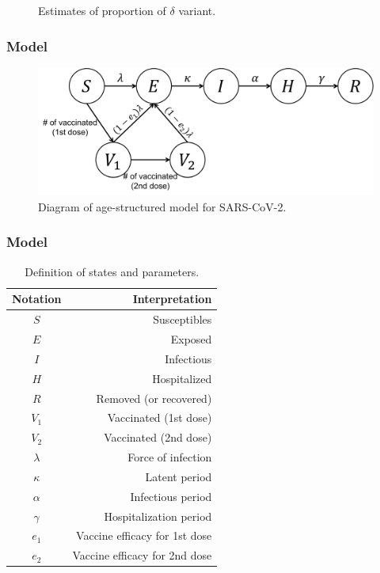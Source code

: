 \documentclass[aspectratio=169, 9pt, xcolor=dvipsnames]{beamer}
\begin{document}
\begin{frame}
\begin{minipage}{0.6\textwidth}
\begin{figure}
	    		\caption{Estimates of proportion of $\delta$ variant.}
	    	\end{figure}
	    \end{minipage}
	\end{frame}

	\begin{frame}\frametitle{Model}
	    \begin{figure}
	    	\centering
	    	\includegraphics[width=12cm]{diagram.pdf}
	    	\caption{Diagram of age-structured model for SARS-CoV-2.}
	    \end{figure}
	\end{frame}

	\begin{frame}\frametitle{Model}
	    \begin{table}
	    	\begin{tabular}{cr}
	    		\toprule
	    		\textbf{Notation} & \textbf{Interpretation} \\
	    		\midrule
	    		$S$ & Susceptibles \\
	    		$E$ & Exposed \\
	    		$I$ & Infectious \\
	    		$H$ & Hospitalized \\
	    		$R$ & Removed (or recovered) \\
	    		$V_1$ & Vaccinated (1st dose) \\
	    		$V_2$ & Vaccinated (2nd dose) \\
	    		$\lambda$ & Force of infection \\
	    		$\kappa$ & Latent period \\
	    		$\alpha$ & Infectious period \\
	    		$\gamma$ & Hospitalization period \\
	    		$e_1$ & Vaccine efficacy for 1st dose \\
	    		$e_2$ & Vaccine efficacy for 2nd dose \\
	    		\bottomrule
	    	\end{tabular}
	    	\caption{Definition of states and parameters.}
	    \end{table}
	\end{frame}
\end{document}
